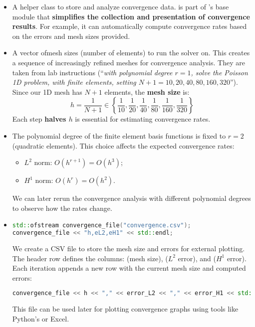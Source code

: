 \begin{itemize}
    \item {} A helper class to store and analyze convergence data.  is part of 's base module that \textbf{simplifies the collection and presentation of convergence results}. For example, it can automatically compute convergence rates based on the errors and mesh sizes provided.


    \item {} A vector of\break mesh sizes (number of elements) to run the solver on. This creates a sequence of increasingly refined meshes for convergence analysis. They are taken from lab instructions (``\emph{with polynomial degree $r = 1$, solve the Poisson 1D problem, with finite elements, setting $N + 1 = 10, 20, 40, 80, 160,$\break $320$}''). Since our 1D mesh has $N+1$ elements, the \textbf{mesh size} is:
    \begin{equation*}
        h = \dfrac{1}{N+1} \in \left\{\dfrac{1}{10}, \dfrac{1}{20}, \dfrac{1}{40}, \dfrac{1}{80}, \dfrac{1}{160}, \dfrac{1}{320}\right\}
    \end{equation*}
    Each step \textbf{halves $h$} is essential for estimating convergence rates.


    \item {} The polynomial degree of the finite element basis functions is fixed to $r=2$ (quadratic elements). This choice affects the expected convergence rates:
    \begin{itemize}
        \item $L^2$ norm: $O(h^{r+1}) = O(h^{3})$;
        \item $H^1$ norm: $O(h^{r}) = O(h^{2})$.
    \end{itemize}
    We can later rerun the convergence analysis with different polynomial degrees to observe how the rates change.


    \item {}
    \begin{lstlisting}[language=C++]
std::ofstream convergence_file("convergence.csv");
convergence_file << "h,eL2,eH1" << std::endl;\end{lstlisting}
    We create a CSV file to store the mesh size and errors for external plotting. The header row defines the columns:  (mesh size),  ($L^2$ error), and  ($H^1$ error). Each iteration appends a new row with the current mesh size and computed errors:
    \begin{lstlisting}[language=C++]
convergence_file << h << "," << error_L2 << "," << error_H1 << std::endl;\end{lstlisting}
    This file can be used later for plotting convergence graphs using tools like Python's  or Excel.



\end{itemize}
